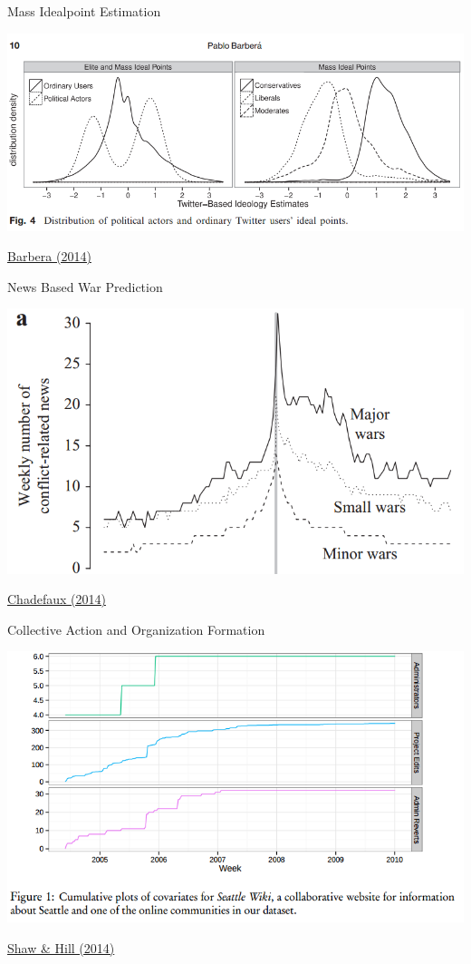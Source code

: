 \documentclass[ignorenonframetext,]{beamer}
\begin{document}
\begin{frame}{Mass Idealpoint Estimation}

\includegraphics{fig/barbera.png}

\href{http://pan.oxfordjournals.org/content/early/2014/09/11/pan.mpu011.full.pdf+html}{Barbera
(2014)}

\end{frame}

\begin{frame}{News Based War Prediction}

\includegraphics{fig/chadefaux.png}

\href{http://jpr.sagepub.com/content/51/1/5.full}{Chadefaux (2014)}

\end{frame}

\begin{frame}{Collective Action and Organization Formation}

\includegraphics{fig/shawhill.png}

\href{https://mako.cc/academic/}{Shaw \& Hill (2014)}

\end{frame}
\end{document}
